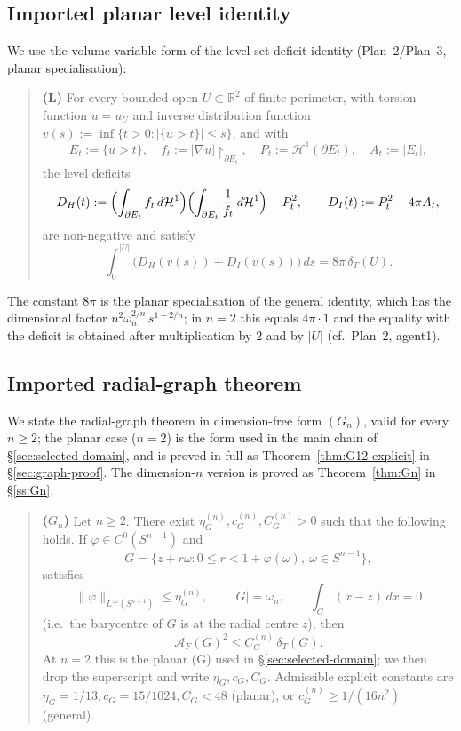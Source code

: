 \documentclass[11pt]{amsart}
\newcommand{\R}{\mathbb R}
\newcommand{\dT}{\delta_T}
\newcommand{\AF}{\mathcal A_F}
\newcommand{\HH}{\mathcal H}
\begin{document}
\subsection{Imported planar level identity}

We use the volume-variable form of the level-set deficit identity
(Plan~2/Plan~3, planar specialisation):

\begin{quote}
\textbf{(L)} For every bounded open \(U\subset\R^2\) of finite
perimeter, with torsion function \(u=u_U\) and inverse distribution
function \(v(s):=\inf\{t>0:|\{u>t\}|\le s\}\), and with
\[
   E_t:=\{u>t\},\quad
   f_t:=|\nabla u|\restriction_{\partial E_t},\quad
   P_t:=\HH^1(\partial E_t),\quad
   A_t:=|E_t|,
\]
the level deficits
\begin{equation}\label{eq:DH-DI-def}
   D_H(t):=
      \Bigl(\int_{\partial E_t}f_t\,d\HH^1\Bigr)
      \Bigl(\int_{\partial E_t}\frac1{f_t}\,d\HH^1\Bigr)
      -P_t^2,
   \qquad
   D_I(t):=P_t^2-4\pi A_t,
\end{equation}
are non-negative and satisfy
\begin{equation}\label{eq:level-identity}
   \int_0^{|U|}\bigl(D_H(v(s))+D_I(v(s))\bigr)\,ds
      =8\pi\,\dT(U).
\end{equation}
\end{quote}

The constant \(8\pi\) is the planar specialisation of the general
identity, which has the dimensional factor
\(n^2\omega_n^{2/n}\,s^{1-2/n}\); in \(n=2\) this equals \(4\pi\cdot 1\)
and the equality with the deficit is obtained after multiplication by
\(2\) and by \(|U|\) (cf.\ Plan~2, agent1).

\subsection{Imported radial-graph theorem}\label{ss:G-import}

We state the radial-graph theorem in dimension-free form
$(G_n)$, valid for every $n\ge 2$; the planar case ($n=2$) is the
form used in the main chain of \S\ref{sec:selected-domain}, and
is proved in full as Theorem~\ref{thm:G12-explicit} in
\S\ref{sec:graph-proof}.  The dimension-$n$ version is proved as
Theorem~\ref{thm:Gn} in \S\ref{ss:Gn}.

\begin{quote}
\textbf{($G_n$)} Let $n\ge 2$.  There exist
$\eta_G^{(n)},c_G^{(n)},C_G^{(n)}>0$ such that the following holds.
If $\varphi\in C^0(S^{n-1})$ and
\[
   G=\{z+r\omega:0\le r<1+\varphi(\omega),\ \omega\in S^{n-1}\},
\]
satisfies
\[
   \|\varphi\|_{L^\infty(S^{n-1})}\le\eta_G^{(n)},
   \qquad
   |G|=\omega_n,
   \qquad
   \int_G(x-z)\,dx=0
\]
\textup{(i.e.\ the barycentre of $G$ is at the radial centre $z$)},
then
\begin{equation}\label{eq:graph-theorem}
   \AF(G)^{2}\le C_G^{(n)}\,\dT(G).
\end{equation}
At $n=2$ this is the planar (G) used in
\S\ref{sec:selected-domain}; we then drop the superscript and write
$\eta_G,c_G,C_G$.  Admissible explicit constants are
$\eta_G=1/13,c_G=15/1024,C_G<48$ (planar), or
$c_G^{(n)}\ge 1/(16 n^{2})$ (general).
\end{quote}
\end{document}
